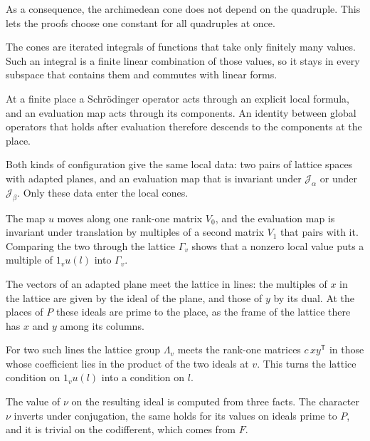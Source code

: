 As a consequence, the archimedean cone does not depend on the quadruple. This
lets the proofs choose one constant for all quadruples at once.

The cones are iterated integrals of functions that take only finitely many
values. Such an integral is a finite linear combination of those values, so it
stays in every subspace that contains them and commutes with linear forms.

At a finite place a Schrödinger operator acts through an explicit local
formula, and an evaluation map acts through its components. An identity
between global operators that holds after evaluation therefore descends to the
components at the place.

Both kinds of configuration give the same local data: two pairs of lattice
spaces with adapted planes, and an evaluation map that is invariant under
$\mathcal J_\alpha$ or under $\mathcal J_\beta$. Only these data enter the local
cones.

The map $u$ moves along one rank-one matrix $V_0$, and the evaluation map is
invariant under translation by multiples of a second matrix $V_1$ that pairs
with it. Comparing the two through the lattice $\Gamma_v$ shows that a nonzero
local value puts a multiple of $1_vu(l)$ into $\Gamma_v$.

The vectors of an adapted plane meet the lattice in lines: the multiples of $x$
in the lattice are given by the ideal of the plane, and those of $y$ by its dual.
At the places of $P$ these ideals are prime to the place, as the frame of the
lattice there has $x$ and $y$ among its columns.

For two such lines the lattice group $\Lambda_v$ meets the rank-one matrices
$c\,xy^{\mathsf T}$ in those whose coefficient lies in the product of the two
ideals at $v$. This turns the lattice condition on $1_vu(l)$ into a condition on
$l$.

The value of $\nu$ on the resulting ideal is computed from three facts. The
character $\nu$ inverts under conjugation, the same holds for its values on
ideals prime to $P$, and it is trivial on the codifferent, which comes from $F$.

